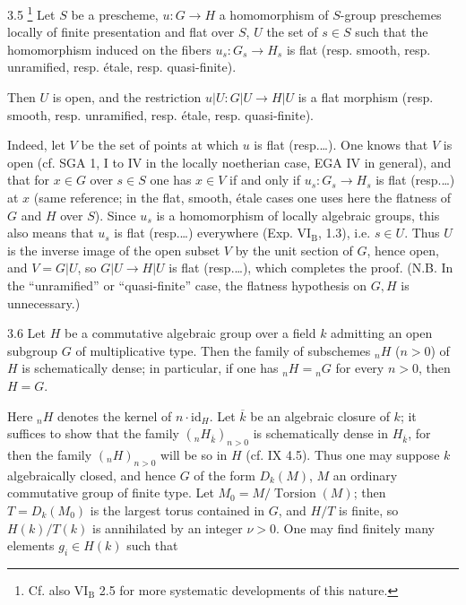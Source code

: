 \begin{lemma}{3.5}\label{X.3.5}
\footnote{Cf. also VI$_{\mathrm B}$ 2.5 for more systematic developments of this nature.} Let $S$ be a prescheme, $u:G\to H$ a homomorphism of $S$-group preschemes locally of finite presentation and flat over $S$, $U$ the set of $s\in S$ such that the homomorphism induced on the fibers $u_s:G_s\to H_s$ is flat (resp. smooth, resp. unramified, resp. étale, resp. quasi-finite).

Then $U$ is open, and the restriction $u|U:G|U\to H|U$ is a flat morphism (resp. smooth, resp. unramified, resp. étale, resp. quasi-finite).
\end{lemma}
Indeed, let $V$ be the set of points at which $u$ is flat (resp.\dots). One knows that $V$ is open (cf. SGA 1, I to IV in the locally noetherian case, EGA IV in general), and that for $x\in G$ over $s\in S$ one has $x\in V$ if and only if $u_s:G_s\to H_s$ is flat (resp.\dots) at $x$ (same reference; in the flat, smooth, étale cases one uses here the flatness of $G$ and $H$ over $S$). Since $u_s$ is a homomorphism of locally algebraic groups, this also means that $u_s$ is flat (resp.\dots) everywhere (Exp. VI$_{\mathrm B}$, 1.3), i.e. $s\in U$. Thus $U$ is the inverse image of the open subset $V$ by the unit section of $G$, hence open, and $V=G|U$, so $G|U\to H|U$ is flat (resp.\dots), which completes the proof. (N.B. In the ``unramified'' or ``quasi-finite'' case, the flatness hypothesis on $G,H$ is unnecessary.)
\begin{lemma}{3.6}\label{X.3.6}
Let $H$ be a commutative algebraic group over a field $k$ admitting an open subgroup $G$ of multiplicative type. Then the family of subschemes ${}_nH$ ($n>0$) of $H$ is schematically dense; in particular, if one has ${}_nH={}_nG$ for every $n>0$, then $H=G$.
\end{lemma}
Here ${}_nH$ denotes the kernel of $n\cdot\mathrm{id}_H$. Let $\overline k$ be an algebraic closure of $k$; it suffices to show that the family $({}_nH_{\overline k})_{n>0}$ is schematically dense in $H_{\overline k}$, for then the family $({}_nH)_{n>0}$ will be so in $H$ (cf. IX 4.5). Thus one may suppose $k$ algebraically closed, and hence $G$ of the form $D_k(M)$, $M$ an ordinary commutative group of finite type. Let $M_0=M/\operatorname{Torsion}(M)$; then $T=D_k(M_0)$ is the largest torus contained in $G$, and $H/T$ is finite, so $H(k)/T(k)$ is annihilated by an integer $\nu>0$. One may find finitely many elements $g_i\in H(k)$ such that

